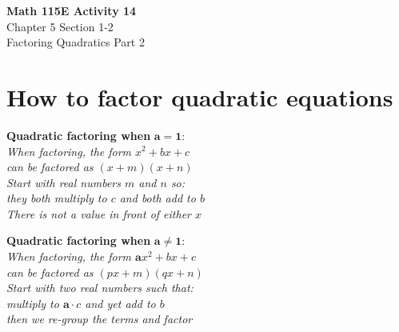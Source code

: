 \documentclass[12pt]{article}
\begin{document}
\begin{center}
    \Large \textbf{Math 115E Activity 14} \\
    \vspace{0.2cm}
    \normalsize Chapter 5 Section 1-2 \\
    \normalsize Factoring Quadratics Part 2
\end{center}

\noindent
\section*{How to factor quadratic equations}
\noindent
\begin{minipage}[t]{0.48\textwidth}
\begin{tcolorbox}[
    width=\linewidth,
    colframe=black,         %
    colback=white,          %
    boxrule=0.5pt,          %
    left=1mm, right=1.1mm,    %
    top=1mm, bottom=1mm,    %
    arc=2mm                 %
]
\textbf{Quadratic factoring when} $\mathbf{a = 1}$: \\ 
\textit{When factoring, the form $x^2 + bx + c$ \\
can be factored as $(x+m)(x+n)$\\
Start with real numbers $m$ and $n$ so: \\
they both multiply to $c$ and both add to $b$\\
There is not a value in front of either $x$}
\end{tcolorbox}
\end{minipage}%
\hfill
\begin{minipage}[t]{0.48\textwidth}
\begin{tcolorbox}[
    width=\linewidth,
    colframe=black,         %
    colback=white,          %
    boxrule=0.5pt,          %
    left=1mm, right=1.1mm,    %
    top=1mm, bottom=1mm,    %
    arc=2mm                 %
]
\textbf{Quadratic factoring when} $\mathbf{a \neq 1}$: \\ 
\textit{When factoring, the form $\boldsymbol{a}x^2 + bx + c$ \\
can be factored as $(px+m)(qx+n)$\\
Start with two real numbers such that: \\
multiply to $\boldsymbol{a} \cdot c$ and yet add to $b$ \\
then we re-group the terms and factor}
\end{tcolorbox}
\end{minipage}
\end{document}
